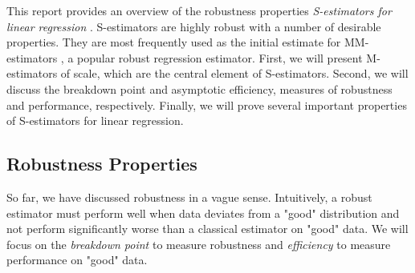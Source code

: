 This report provides an overview of the robustness properties \textit{S-estimators for linear regression} \cite{rousseeuw1984robust}. S-estimators are highly robust with a number of desirable properties. They are most frequently used as the initial estimate for MM-estimators \cite{yohai1987high}, a popular robust regression estimator. First, we will present M-estimators of scale, which are the central element of S-estimators. Second, we will discuss the breakdown point and asymptotic efficiency, measures of robustness and performance, respectively. Finally, we will prove several important properties of S-estimators for linear regression.


\subsection{Robustness Properties}

So far, we have discussed robustness in a vague sense. Intuitively, a robust estimator must perform well when data deviates from a "good" distribution and not perform significantly worse than a classical estimator on "good" data. We will focus on the \textit{breakdown point} to measure robustness and \textit{efficiency} to measure performance on "good" data.

